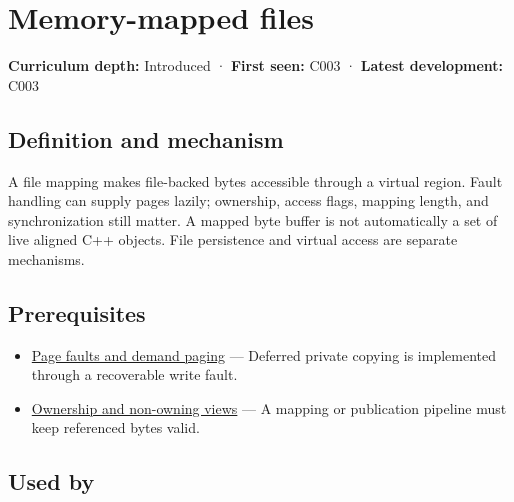 \hypertarget{appendix-313ee7a0ba7b}{}\label{referencestart:appendix-313ee7a0ba7b}
\section{Memory-mapped files}\label{appendix-313ee7a0ba7b-memory-mapped-files}

\hypertarget{appendix-313ee7a0ba7b-memory-mapped-files}{}

\textbf{Curriculum depth:} Introduced · \textbf{First seen:} C003 · \textbf{Latest development:} C003

\begin{allmightroledefinition}

\subsection{Definition and mechanism}\label{appendix-313ee7a0ba7b-definition-and-mechanism}

\hypertarget{appendix-313ee7a0ba7b-definition-and-mechanism}{}

A file mapping makes file-backed bytes accessible through a virtual region. Fault handling can supply pages lazily; ownership, access flags, mapping length, and synchronization still matter. A mapped byte buffer is not automatically a set of live aligned C++ objects. File persistence and virtual access are separate mechanisms.

\end{allmightroledefinition}

\subsection{Prerequisites}\label{appendix-313ee7a0ba7b-prerequisites}

\hypertarget{appendix-313ee7a0ba7b-prerequisites}{}

\begin{itemize}
\tightlist
\item
  \hyperref[appendix-cc0909a7ef14]{Page faults and demand paging} --- Deferred private copying is implemented through a recoverable write fault.
\item
  \hyperref[appendix-d52e4486f527]{Ownership and non-owning views} --- A mapping or publication pipeline must keep referenced bytes valid.
\end{itemize}

\subsection{Used by}\label{appendix-313ee7a0ba7b-used-by}

